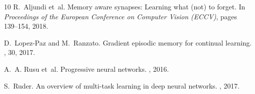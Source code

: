 \documentclass{article}
\begin{document}
\begin{thebibliography}{10}
R.~Aljundi et~al.
\newblock Memory aware synapses: Learning what (not) to forget.
\newblock In {\em Proceedings of the European Conference on Computer Vision (ECCV)}, pages 139--154, 2018.

D.~Lopez-Paz and M.~Ranzato.
\newblock Gradient episodic memory for continual learning.
, 30, 2017.

A.~A. Rusu et~al.
\newblock Progressive neural networks.
, 2016.

S.~Ruder.
\newblock An overview of multi-task learning in deep neural networks.
, 2017.

\end{thebibliography}
\end{document}
